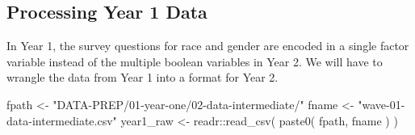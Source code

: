 \documentclass[
  letterpaper,
]{scrbook}
\newenvironment{Shaded}{\begin{snugshade}}{\end{snugshade}}
\newcommand{\DecValTok}[1]{\textcolor[rgb]{0.68,0.00,0.00}{#1}}
\newcommand{\FunctionTok}[1]{\textcolor[rgb]{0.28,0.35,0.67}{#1}}
\newcommand{\NormalTok}[1]{\textcolor[rgb]{0.00,0.23,0.31}{#1}}
\newcommand{\OtherTok}[1]{\textcolor[rgb]{0.00,0.23,0.31}{#1}}
\newcommand{\SpecialCharTok}[1]{\textcolor[rgb]{0.37,0.37,0.37}{#1}}
\newcommand{\StringTok}[1]{\textcolor[rgb]{0.13,0.47,0.30}{#1}}
\begin{document}
\begin{Shaded}
\end{Shaded}

\subsection{Processing Year 1 Data}\label{processing-year-1-data}

In Year 1, the survey questions for race and gender are encoded in a
single factor variable instead of the multiple boolean variables in Year
2. We will have to wrangle the data from Year 1 into a format for Year
2.

\begin{Shaded}
\begin{Highlighting}[]
\NormalTok{fpath     }\OtherTok{\textless{}{-}} \StringTok{"DATA{-}PREP/01{-}year{-}one/02{-}data{-}intermediate/"}
\NormalTok{fname     }\OtherTok{\textless{}{-}} \StringTok{"wave{-}01{-}data{-}intermediate.csv"}
\NormalTok{year1\_raw }\OtherTok{\textless{}{-}}\NormalTok{ readr}\SpecialCharTok{::}\FunctionTok{read\_csv}\NormalTok{( }\FunctionTok{paste0}\NormalTok{( fpath, fname ) )}
\end{Highlighting}
\end{Shaded}
\end{document}
